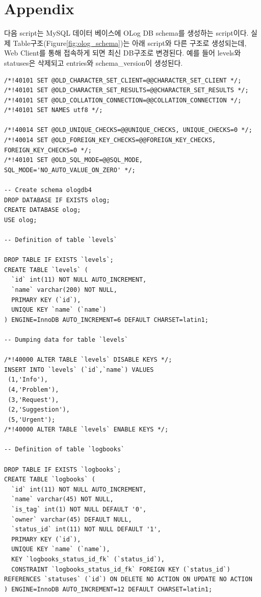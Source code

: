 \documentclass[11pt
  , a4paper
  , article
  , oneside
]{memoir}
\newcommand{\newappendix}{%
  \refstepcounter{chapter}\chapter*{Appendix \thechapter}%
  \addcontentsline{toc}{chapter}{Appendix \thechapter}%
}
\begin{document}




\newpage
\appendix
\newappendix
다음 script는 MySQL 데이터 베이스에 OLog DB schema를 생성하는 script이다. 
실제 Table구조(Figure\ref{fig:olog_schema})는 아래 script와 다른 구조로 생성되는데, 
Web Client를 통해 접속하게 되면 최신 DB구조로 변경된다.
예를 들어 levels와 statuses은 삭제되고 entries와 schema\_version이 생성된다.

\begin{lstlisting}[style=termstylenumber, caption={olog\_schema.sql}, label={list:nfsroot-file}]
/*!40101 SET @OLD_CHARACTER_SET_CLIENT=@@CHARACTER_SET_CLIENT */;
/*!40101 SET @OLD_CHARACTER_SET_RESULTS=@@CHARACTER_SET_RESULTS */;
/*!40101 SET @OLD_COLLATION_CONNECTION=@@COLLATION_CONNECTION */;
/*!40101 SET NAMES utf8 */;

/*!40014 SET @OLD_UNIQUE_CHECKS=@@UNIQUE_CHECKS, UNIQUE_CHECKS=0 */;
/*!40014 SET @OLD_FOREIGN_KEY_CHECKS=@@FOREIGN_KEY_CHECKS, FOREIGN_KEY_CHECKS=0 */;
/*!40101 SET @OLD_SQL_MODE=@@SQL_MODE, SQL_MODE='NO_AUTO_VALUE_ON_ZERO' */;

-- Create schema ologdb4
DROP DATABASE IF EXISTS olog;
CREATE DATABASE olog;
USE olog;

-- Definition of table `levels`

DROP TABLE IF EXISTS `levels`;
CREATE TABLE `levels` (
  `id` int(11) NOT NULL AUTO_INCREMENT,
  `name` varchar(200) NOT NULL,
  PRIMARY KEY (`id`),
  UNIQUE KEY `name` (`name`)
) ENGINE=InnoDB AUTO_INCREMENT=6 DEFAULT CHARSET=latin1;

-- Dumping data for table `levels`

/*!40000 ALTER TABLE `levels` DISABLE KEYS */;
INSERT INTO `levels` (`id`,`name`) VALUES
 (1,'Info'),
 (4,'Problem'),
 (3,'Request'),
 (2,'Suggestion'),
 (5,'Urgent');
/*!40000 ALTER TABLE `levels` ENABLE KEYS */;

-- Definition of table `logbooks`

DROP TABLE IF EXISTS `logbooks`;
CREATE TABLE `logbooks` (
  `id` int(11) NOT NULL AUTO_INCREMENT,
  `name` varchar(45) NOT NULL,
  `is_tag` int(1) NOT NULL DEFAULT '0',
  `owner` varchar(45) DEFAULT NULL,
  `status_id` int(11) NOT NULL DEFAULT '1',
  PRIMARY KEY (`id`),
  UNIQUE KEY `name` (`name`),
  KEY `logbooks_status_id_fk` (`status_id`),
  CONSTRAINT `logbooks_status_id_fk` FOREIGN KEY (`status_id`) REFERENCES `statuses` (`id`) ON DELETE NO ACTION ON UPDATE NO ACTION
) ENGINE=InnoDB AUTO_INCREMENT=12 DEFAULT CHARSET=latin1;


\end{lstlisting}
\end{document}
